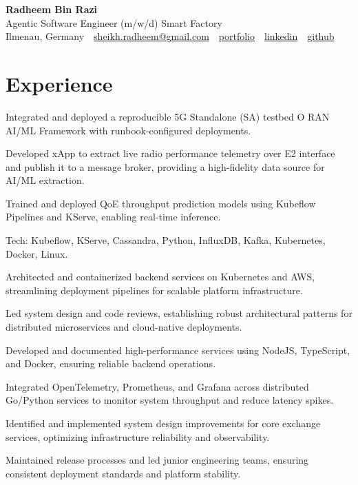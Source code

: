 \documentclass[10pt,a4paper]{resume}
\makeatletter
\newcommand{\Portfolio}{https://radheem.github.io/my-cv}
\newcommand{\PortfolioText}{portfolio}
\newcommand{\GitHub}{https://github.com/radheem}
\newcommand{\LinkedIn}{https://www.linkedin.com/in/radheem-razi}
\newcommand{\Email}{sheikh.radheem@gmail.com}
\makeatother
\begin{document}
\begin{center}
  {\huge\bfseries Radheem Bin Razi}\\[3pt]
  {\large Agentic Software Engineer (m/w/d) Smart Factory}\\[6pt]
  \small
  Ilmenau, Germany \,\textbar\,
  \href{mailto:\Email}{\Email} \,\textbar\,
  \href{\Portfolio}{\PortfolioText} \,\textbar\,
  \href{\LinkedIn}{linkedin} \,\textbar\,
  \href{\GitHub}{github}
\end{center}
\vspace{2pt}

\section{Experience}

\bullets
  \item Integrated and deployed a reproducible 5G Standalone (SA) testbed O RAN AI/ML Framework with runbook-configured deployments.
  \item Developed xApp to extract live radio performance telemetry over E2 interface and publish it to a message broker, providing a high-fidelity data source for AI/ML extraction.
  \item Trained and deployed QoE throughput prediction models using Kubeflow Pipelines and KServe, enabling real-time inference.
  \item Tech: Kubeflow, KServe, Cassandra, Python, InfluxDB, Kafka, Kubernetes, Docker, Linux.
\bulletsend
\vspace{1.5pt}
\bullets
  \item Architected and containerized backend services on Kubernetes and AWS, streamlining deployment pipelines for scalable platform infrastructure.
  \item Led system design and code reviews, establishing robust architectural patterns for distributed microservices and cloud-native deployments.
  \item Developed and documented high-performance services using NodeJS, TypeScript, and Docker, ensuring reliable backend operations.
\bulletsend
\vspace{1.5pt}
\bullets
  \item Integrated OpenTelemetry, Prometheus, and Grafana across distributed Go/Python services to monitor system throughput and reduce latency spikes.
  \item Identified and implemented system design improvements for core exchange services, optimizing infrastructure reliability and observability.
  \item Maintained release processes and led junior engineering teams, ensuring consistent deployment standards and platform stability.
\bulletsend
\vspace{1.5pt}
\end{document}
